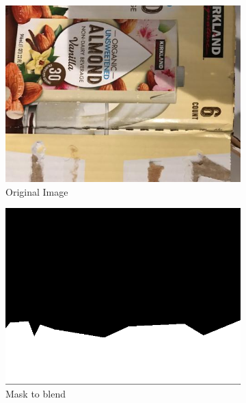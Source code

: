 \documentclass{article}
\begin{document}
\begin{figure}
  \centering
  \begin{subfigure}[b]{0.2\linewidth}
    \includegraphics[width=\linewidth]{data/images/04_GP_GAN/cardboard254.jpg}
     \caption{Original Image}
  \end{subfigure}
  \begin{subfigure}[b]{0.2\linewidth}
    \includegraphics[width=\linewidth]{data/images/04_GP_GAN/mask_display.png}
    \caption{Mask to blend}
  \end{subfigure}
  \begin{subfigure}[b]{0.2\linewidth}

\end{subfigure}
\end{figure}
\end{document}
